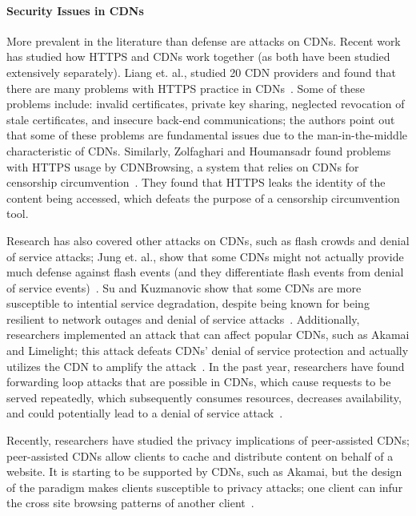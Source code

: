 \paragraph{Security Issues in CDNs} More prevalent in the literature than defense are attacks on CDNs.  Recent work 
has studied how HTTPS and CDNs work together (as both have been studied extensively separately).  Liang et. al., studied 
20 CDN providers and found that there are many problems with HTTPS practice in CDNs~\cite{liang2014https}.  Some of these 
problems include: invalid certificates, private key sharing, neglected revocation of stale certificates, and 
insecure back-end communications; the authors point out that some of these problems are fundamental issues due to 
the man-in-the-middle characteristic of CDNs.  Similarly, Zolfaghari and Houmansadr found problems with HTTPS usage by 
CDNBrowsing, a system that relies on CDNs for censorship circumvention~\cite{zolfaghari2016practical}.  They found that HTTPS 
leaks the identity of the content being accessed, which defeats the purpose of a censorship circumvention tool. 

Research has also covered other attacks on CDNs, such as flash crowds and denial of service attacks; Jung et. al., show 
that some CDNs might not actually provide much defense against flash events (and they differentiate flash events from denial 
of service events)~\cite{jung2002flash}. Su and Kuzmanovic show that some CDNs are more susceptible to intential service 
degradation, despite being known for being resilient to network outages and denial of service attacks~\cite{su2008thinning}. 
Additionally, researchers implemented an attack that can affect popular CDNs, such as Akamai and Limelight; this attack 
defeats CDNs' denial of service protection and actually utilizes the CDN to amplify the attack~\cite{triukose2009content}.  In the 
past year, researchers have found forwarding loop attacks that are possible in CDNs, which cause requests to be served repeatedly, which 
subsequently consumes resources, decreases availability, and could potentially lead to a denial of service attack~\cite{chen2016forwarding}.

Recently, researchers have studied the privacy implications of peer-assisted CDNs; peer-assisted CDNs allow clients to cache and distribute 
content on behalf of a website.  It is starting to be supported by CDNs, such as Akamai, but the design of the paradigm
makes clients susceptible to privacy attacks; one client can infur the cross site browsing patterns of another client~\cite{jia2016anonymity}.\\

